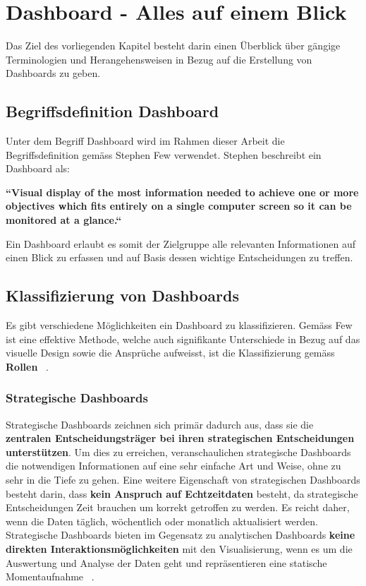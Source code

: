 \section{Dashboard - Alles auf einem Blick}
Das Ziel des vorliegenden Kapitel besteht darin einen Überblick über gängige Terminologien und Herangehensweisen in Bezug auf die Erstellung von Dashboards zu geben. 

\subsection{Begriffsdefinition Dashboard} \label{ch:definition_dashboard}
Unter dem Begriff Dashboard wird im Rahmen dieser Arbeit die Begriffsdefinition gemäss Stephen Few verwendet. Stephen beschreibt ein Dashboard als:

\begin{center}
\textbf{``Visual display of the most information needed to achieve one or more objectives which fits entirely on a single computer screen so it can be monitored at a glance.``} ~\citep[S. 34]{information_dashboard_design}  
\end{center}

Ein Dashboard erlaubt es somit der Zielgruppe alle relevanten Informationen auf einen Blick zu erfassen und auf Basis dessen wichtige Entscheidungen zu treffen.

\subsection{Klassifizierung von Dashboards} \label{ch:theory_classification_of_dashboards} \label{ch:classification_of_dashboards}
Es gibt verschiedene Möglichkeiten ein Dashboard zu klassifizieren. Gemäss Few ist eine effektive Methode, welche auch signifikante Unterschiede in Bezug auf das visuelle Design sowie die Ansprüche aufweisst, ist die Klassifizierung gemäss \textbf{Rollen} ~\citep[S. 40]{information_dashboard_design}.

\subsubsection{Strategische Dashboards}
Strategische Dashboards zeichnen sich primär dadurch aus, dass sie die \textbf{zentralen Entscheidungsträger bei ihren strategischen Entscheidungen unterstützen}. Um dies zu erreichen, veranschaulichen strategische Dashboards die notwendigen Informationen auf eine sehr einfache Art und Weise, ohne zu sehr in die Tiefe zu gehen. Eine weitere Eigenschaft von strategischen Dashboards besteht darin, dass \textbf{kein Anspruch auf Echtzeitdaten} besteht, da strategische Entscheidungen Zeit brauchen um korrekt getroffen zu werden. Es reicht daher, wenn die Daten täglich, wöchentlich oder monatlich aktualisiert werden. Strategische Dashboards bieten im Gegensatz zu analytischen Dashboards \textbf{keine direkten Interaktionsmöglichkeiten} mit den Visualisierung, wenn es um die Auswertung und Analyse der Daten geht und repräsentieren eine statische Momentaufnahme ~\citep[S. 41]{information_dashboard_design}.

